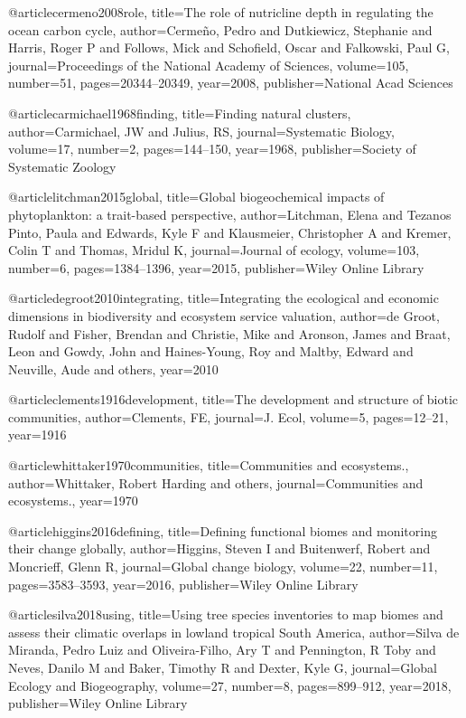 {{{{{{{{{@article{cermeno2008role,
  title={The role of nutricline depth in regulating the ocean carbon cycle},
  author={Cerme{\~n}o, Pedro and Dutkiewicz, Stephanie and Harris, Roger P and Follows, Mick and Schofield, Oscar and Falkowski, Paul G},
  journal={Proceedings of the National Academy of Sciences},
  volume={105},
  number={51},
  pages={20344--20349},
  year={2008},
  publisher={National Acad Sciences}
}

@article{carmichael1968finding,
  title={Finding natural clusters},
  author={Carmichael, JW and Julius, RS},
  journal={Systematic Biology},
  volume={17},
  number={2},
  pages={144--150},
  year={1968},
  publisher={Society of Systematic Zoology}
}


@article{litchman2015global,
  title={Global biogeochemical impacts of phytoplankton: a trait-based perspective},
  author={Litchman, Elena and Tezanos Pinto, Paula and Edwards, Kyle F and Klausmeier, Christopher A and Kremer, Colin T and Thomas, Mridul K},
  journal={Journal of ecology},
  volume={103},
  number={6},
  pages={1384--1396},
  year={2015},
  publisher={Wiley Online Library}
}


@article{degroot2010integrating,
  title={Integrating the ecological and economic dimensions in biodiversity and ecosystem service valuation},
  author={{de Groot}, Rudolf and Fisher, Brendan and Christie, Mike and Aronson, James and Braat, Leon and Gowdy, John and Haines-Young, Roy and Maltby, Edward and Neuville, Aude and others},
  year={2010}
}

@article{clements1916development,
  title={The development and structure of biotic communities},
  author={Clements, FE},
  journal={J. Ecol},
  volume={5},
  pages={12--21},
  year={1916}
}



@article{whittaker1970communities,
  title={Communities and ecosystems.},
  author={Whittaker, Robert Harding and others},
  journal={Communities and ecosystems.},
  year={1970}
}


@article{higgins2016defining,
  title={Defining functional biomes and monitoring their change globally},
  author={Higgins, Steven I and Buitenwerf, Robert and Moncrieff, Glenn R},
  journal={Global change biology},
  volume={22},
  number={11},
  pages={3583--3593},
  year={2016},
  publisher={Wiley Online Library}
}


@article{silva2018using,
  title={Using tree species inventories to map biomes and assess their climatic overlaps in lowland tropical South America},
  author={Silva de Miranda, Pedro Luiz and Oliveira-Filho, Ary T and Pennington, R Toby and Neves, Danilo M and Baker, Timothy R and Dexter, Kyle G},
  journal={Global Ecology and Biogeography},
  volume={27},
  number={8},
  pages={899--912},
  year={2018},
  publisher={Wiley Online Library}
}


}}}}}}}}}
